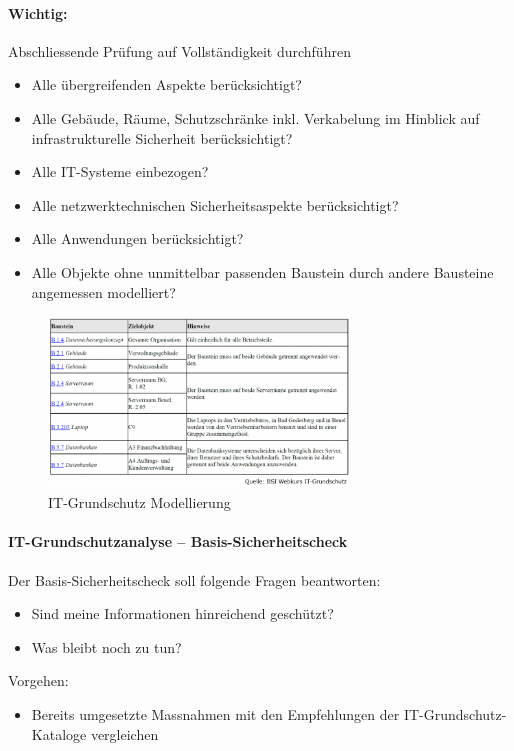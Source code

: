 \documentclass[10pt,a4paper]{article}
\begin{document}
\paragraph*{Wichtig:}Abschliessende Prüfung auf Vollständigkeit durchführen

\begin{itemize}[noitemsep,topsep=0pt,leftmargin=*]
    \item Alle übergreifenden Aspekte berücksichtigt?
    \item Alle Gebäude, Räume, Schutzschränke inkl. Verkabelung im Hinblick auf infrastrukturelle Sicherheit berücksichtigt?
    \item Alle IT-Systeme einbezogen?
    \item Alle netzwerktechnischen Sicherheitsaspekte berücksichtigt?
    \item Alle Anwendungen berücksichtigt?
    \item Alle Objekte ohne unmittelbar passenden Baustein durch andere Bausteine angemessen modelliert?
\end{itemize}

\begin{figure}[H]
    \begin{center}
    \includegraphics[width=8cm]{images/IT-Grundschutz Modellierung.png}
    \caption{IT-Grundschutz Modellierung}
    \label{IT-Grundschutz Modellierung}
    \end{center}
\end{figure}

\paragraph*{IT-Grundschutzanalyse – Basis-Sicherheitscheck} Der Basis-Sicherheitscheck soll folgende Fragen beantworten:
\begin{itemize}[noitemsep,topsep=0pt,leftmargin=*]
    \item Sind meine Informationen hinreichend geschützt?
    \item Was bleibt noch zu tun?
\end{itemize}
\noindent
Vorgehen:
\begin{itemize}[noitemsep,topsep=0pt,leftmargin=*]
    \item Bereits umgesetzte Massnahmen mit den Empfehlungen der IT-Grundschutz-Kataloge vergleichen
\end{itemize}
\end{document}
